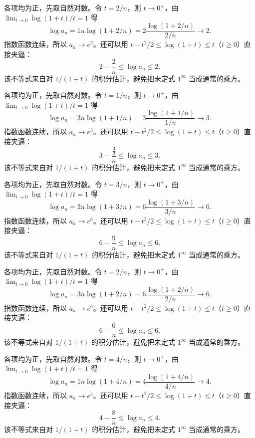 \documentclass[12pt,fontset=fandol]{ctexart}
\begin{document}
\begin{solve}\label{ans:c1q14}
各项均为正，先取自然对数。令 $t=2/n$，则 $t\to0^+$，由 $\lim_{t\to0}\log(1+t)/t=1$ 得
\[
\log a_n=1n\log(1+2/n)=2\frac{\log(1+2/n)}{2/n}\longrightarrow 2.
\]
指数函数连续，所以 $a_n\to e^{2}$。还可以用 $t-t^2/2\le\log(1+t)\le t$（$t\ge0$）直接夹逼：
\[
2-\frac{2}n\le\log a_n\le 2.
\]
该不等式来自对 $1/(1+t)$ 的积分估计，避免把未定式 $1^\infty$ 当成通常的乘方。
\end{solve}

\begin{solve}\label{ans:c1q15}
各项均为正，先取自然对数。令 $t=1/n$，则 $t\to0^+$，由 $\lim_{t\to0}\log(1+t)/t=1$ 得
\[
\log a_n=3n\log(1+1/n)=3\frac{\log(1+1/n)}{1/n}\longrightarrow 3.
\]
指数函数连续，所以 $a_n\to e^{3}$。还可以用 $t-t^2/2\le\log(1+t)\le t$（$t\ge0$）直接夹逼：
\[
3-\frac{\frac{3}{2}}n\le\log a_n\le 3.
\]
该不等式来自对 $1/(1+t)$ 的积分估计，避免把未定式 $1^\infty$ 当成通常的乘方。
\end{solve}

\begin{solve}\label{ans:c1q16}
各项均为正，先取自然对数。令 $t=3/n$，则 $t\to0^+$，由 $\lim_{t\to0}\log(1+t)/t=1$ 得
\[
\log a_n=2n\log(1+3/n)=6\frac{\log(1+3/n)}{3/n}\longrightarrow 6.
\]
指数函数连续，所以 $a_n\to e^{6}$。还可以用 $t-t^2/2\le\log(1+t)\le t$（$t\ge0$）直接夹逼：
\[
6-\frac{9}n\le\log a_n\le 6.
\]
该不等式来自对 $1/(1+t)$ 的积分估计，避免把未定式 $1^\infty$ 当成通常的乘方。
\end{solve}

\begin{solve}\label{ans:c1q17}
各项均为正，先取自然对数。令 $t=2/n$，则 $t\to0^+$，由 $\lim_{t\to0}\log(1+t)/t=1$ 得
\[
\log a_n=3n\log(1+2/n)=6\frac{\log(1+2/n)}{2/n}\longrightarrow 6.
\]
指数函数连续，所以 $a_n\to e^{6}$。还可以用 $t-t^2/2\le\log(1+t)\le t$（$t\ge0$）直接夹逼：
\[
6-\frac{6}n\le\log a_n\le 6.
\]
该不等式来自对 $1/(1+t)$ 的积分估计，避免把未定式 $1^\infty$ 当成通常的乘方。
\end{solve}

\begin{solve}\label{ans:c1q18}
各项均为正，先取自然对数。令 $t=4/n$，则 $t\to0^+$，由 $\lim_{t\to0}\log(1+t)/t=1$ 得
\[
\log a_n=1n\log(1+4/n)=4\frac{\log(1+4/n)}{4/n}\longrightarrow 4.
\]
指数函数连续，所以 $a_n\to e^{4}$。还可以用 $t-t^2/2\le\log(1+t)\le t$（$t\ge0$）直接夹逼：
\[
4-\frac{8}n\le\log a_n\le 4.
\]
该不等式来自对 $1/(1+t)$ 的积分估计，避免把未定式 $1^\infty$ 当成通常的乘方。
\end{solve}
\end{document}
